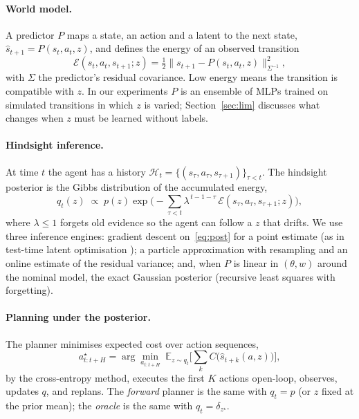 \documentclass[11pt]{article}
\newcommand{\E}{\mathcal{E}}
\begin{document}
\paragraph{World model.} A predictor $P$ maps a state, an action and a latent to the next state,
$\hat s_{t+1}=P(s_t,a_t,z)$, and defines the energy of an observed transition
\begin{equation}
\E(s_t,a_t,s_{t+1};z)=\tfrac12\big\|s_{t+1}-P(s_t,a_t,z)\big\|^2_{\Sigma^{-1}},
\end{equation}
with $\Sigma$ the predictor's residual covariance. Low energy means the transition is compatible with $z$. In our
experiments $P$ is an ensemble of MLPs trained on simulated transitions in which $z$ is varied; Section~\ref{sec:lim}
discusses what changes when $z$ must be learned without labels.

\paragraph{Hindsight inference.} At time $t$ the agent has a history $\mathcal H_t=\{(s_\tau,a_\tau,s_{\tau+1})\}_{\tau<t}$.
The hindsight posterior is the Gibbs distribution of the accumulated energy,
\begin{equation}
q_t(z)\;\propto\;p(z)\exp\Big(-\sum_{\tau<t}\lambda^{\,t-1-\tau}\,\E(s_\tau,a_\tau,s_{\tau+1};z)\Big),
\label{eq:post}
\end{equation}
where $\lambda\le1$ forgets old evidence so the agent can follow a $z$ that drifts. We use three inference engines:
gradient descent on~\eqref{eq:post} for a point estimate (as in test-time latent optimisation \citep{t2z_2610_22364});
a particle approximation with resampling and an online estimate of the residual variance; and, when $P$ is linear in
$(\theta,w)$ around the nominal model, the exact Gaussian posterior (recursive least squares with forgetting).

\paragraph{Planning under the posterior.} The planner minimises expected cost over action sequences,
\begin{equation}
a^\star_{t:t+H}=\arg\min_{a_{t:t+H}}\;\mathbb E_{z\sim q_t}\Big[\textstyle\sum_{k}C\big(\hat s_{t+k}(a,z)\big)\Big],
\end{equation}
by the cross-entropy method, executes the first $K$ actions open-loop, observes, updates $q$, and replans. The
\emph{forward} planner is the same with $q_t=p$ (or $z$ fixed at the prior mean); the \emph{oracle} is the same with
$q_t=\delta_{z^\star}$.
\end{document}
